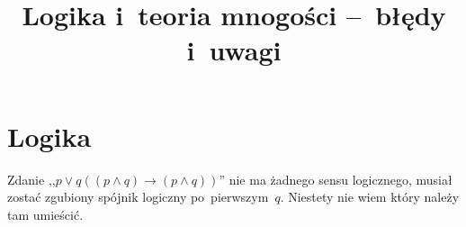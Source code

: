 \documentclass[a4paper,11pt]{article}
\title{Logika i~teoria mnogości --~błędy i~uwagi}
\begin{document}



\maketitle  %



\section{Logika}

\vspace{\spaceTwo}






\start {} Zdanie
,,$p \vee q ( ( p \land q ) \to ( p \land q ) )$'' nie ma żadnego sensu
logicznego, musiał zostać zgubiony spójnik logiczny po~pierwszym~$q$.
Niestety nie wiem który należy tam umieścić.


\end{document}
